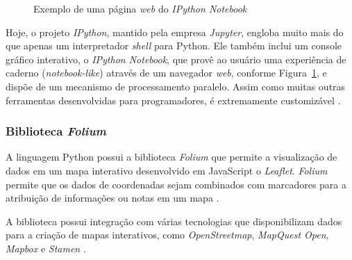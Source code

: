 \begin{figure}[h!]
  \centering
  \vspace{0.1cm}
  \caption{Exemplo de uma página \textit{web} do \textit{IPython Notebook}}
  \label{ipython-fig}
\end{figure}

Hoje, o projeto \textit{IPython}, mantido pela empresa \textit{Jupyter}, engloba muito mais do que apenas um interpretador \textit{shell} para Python. Ele também inclui um console gráfico interativo, o \textit{IPython Notebook}, que provê ao usuário uma experiência de caderno (\textit{notebook-like}) através de um navegador \textit{web}, conforme Figura~\ref{ipython-fig}, e dispõe de um mecanismo de processamento paralelo. Assim como muitas outras ferramentas desenvolvidas para programadores, é extremamente customizável \cite{mining-social-web}.

\subsubsection{Biblioteca \textit{Folium}}
A linguagem Python possui a biblioteca \textit{Folium} que permite a visualização de dados em um mapa interativo desenvolvido em JavaScript o \textit{Leaflet}. \textit{Folium} permite que os dados de coordenadas sejam combinados com marcadores para a atribuição de informações ou notas em um mapa \cite{folium}.

A biblioteca possui integração com várias tecnologias que disponibilizam dados para a criação de mapas interativos, como \textit{OpenStreetmap}, \textit{MapQuest Open}, \textit{Mapbox} e \textit{Stamen} \cite{folium}.

